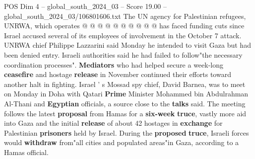 \begin{textsample}{POS Dim 4 – global\_south\_2024\_03 – Score 19.00 – global\_south\_2024\_03/106801606.txt}
The UN agency for Palestinian refugees, UNRWA, which operates @ @ @ @ @ @ @ @ @ @ has faced funding cuts since Israel accused several of its employees of involvement in the October 7 attack.
UNRWA chief Philippe Lazzarini said Monday he intended to visit Gaza but had been denied entry.
Israeli authorities said he had failed to follow"the necessary coordination processes". \textbf{Mediators} who had helped secure a week-long \textbf{ceasefire} and hostage \textbf{release} in November continued their efforts toward another halt in fighting.
Israel ' s Mossad spy chief, David Barnea, was to meet on Monday in Doha with Qatari \textbf{Prime} Minister Mohammed bin Abdulrahman Al-Thani and \textbf{Egyptian} officials, a source close to the \textbf{talks} said.
The meeting follows the latest \textbf{proposal} from Hamas for a \textbf{six-week} \textbf{truce}, vastly more aid into Gaza and the initial \textbf{release} of about 42 hostages in \textbf{exchange} for Palestinian \textbf{prisoners} held by Israel.
During the \textbf{proposed} \textbf{truce}, Israeli forces would \textbf{withdraw} from"all cities and populated areas"in Gaza, according to a Hamas official.

\end{textsample}

